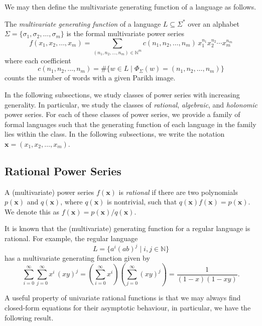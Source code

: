 We may then define the multivariate generating function of a language as follows.

\begin{definition}\label{defn: multivariate-generating-function}
	The \emph{multivariate generating function} of a language $L \subseteq \Sigma^*$ over an alphabet $\Sigma = \{\sigma_1,\sigma_2,\ldots,\sigma_m\}$ is the formal multivariate power series
	\[
		f(x_1,x_2,\ldots,x_m)
		=
		\sum_{(n_1,n_2,\ldots,n_m) \in \mathbb{N}^m}
			c(n_1,n_2,\ldots,n_m)\,
			x_1^{n_1} x_2^{n_2} \cdots x_m^{n_m}
	\]
	where each coefficient
	\[
		c(n_1,n_2,\ldots,n_m)
		=
		\#\{
			w \in L
			\mid
			\Phi_\Sigma(w) = (n_1,n_2,\ldots,n_m)
		\}
	\]
	counts the number of words with a given Parikh image.
\end{definition}

In the following subsections, we study classes of power series with increasing generality.
In particular, we study the classes of \emph{rational}, \emph{algebraic}, and \emph{holonomic} power series.
For each of these classes of power series, we provide a family of formal languages such that the generating function of each language in the family lies within the class.
In the following subsections, we write the notation $\mathbf{x} = (x_1,x_2,\ldots,x_m)$.

\subsection{Rational Power Series}%
\label{sec:formal-language/generating-functions/rational}

A (multivariate) power series $f(\mathbf{x})$ is \emph{rational} if there are two polynomials $p(\mathbf{x})$ and $q(\mathbf{x})$, where $q(\mathbf{x})$ is nontrivial, such that $q(\mathbf{x})f(\mathbf{x}) = p(\mathbf{x})$.
We denote this as $f(\mathbf{x}) = p(\mathbf{x})/q(\mathbf{x})$.

It is known that the (multivariate) generating function for a regular language is rational.
For example, the regular language
\[
	L
	=
	\{
		a^i (ab)^j
	\mid
		i,j \in \mathbb{N}
	\}
\]
has a multivariate generating function given by
\[
	\sum_{i=0}^\infty
	\sum_{j=0}^\infty
	x^i  \, (xy)^j
	=
	\left(
		\sum_{i=0}^\infty
		x^i
	\right)
	\left(
		\sum_{j=0}^\infty
		(xy)^j
	\right)
	=
	\frac{1}{(1-x)(1-xy)}.
\]

A useful property of univariate rational functions is that we may always find closed-form equations for their asymptotic behaviour, in particular, we have the following result.

